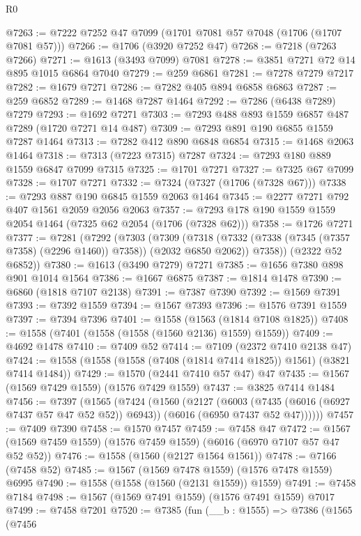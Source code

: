 \begin{lexlean}{R0}
\begin{coremodule}
@7263 := @7222 @7252 @47 @7099 (@1701 @7081 @57 @7048 (@1706 (@1707 @7081 @57)))
@7266 := @1706 (@3920 @7252 @47)
@7268 := @7218 (@7263 @7266)
@7271 := @1613 (@3493 @7099) @7081
@7278 := @3851 @7271 @72 @14 @895 @1015 @6864 @7040
@7279 := @259 @6861
@7281 := @7278 @7279 @7217
@7282 := @1679 @7271
@7286 := @7282 @405 @894 @6858 @6863
@7287 := @259 @6852
@7289 := @1468 @7287 @1464
@7292 := @7286 (@6438 @7289) @7279
@7293 := @1692 @7271
@7303 := @7293 @488 @893 @1559 @6857 @487 @7289 (@1720 @7271 @14 @487)
@7309 := @7293 @891 @190 @6855 @1559 @7287 @1464
@7313 := @7282 @412 @890 @6848 @6854
@7315 := @1468 @2063 @1464
@7318 := @7313 (@7223 @7315) @7287
@7324 := @7293 @180 @889 @1559 @6847 @7099 @7315
@7325 := @1701 @7271
@7327 := @7325 @67 @7099
@7328 := @1707 @7271
@7332 := @7324 (@7327 (@1706 (@7328 @67)))
@7338 := @7293 @887 @190 @6845 @1559 @2063 @1464
@7345 := @2277 @7271 @792 @407 @1561 @2059 @2056 @2063
@7357 := @7293 @178 @190 @1559 @1559 @2054 @1464 (@7325 @62 @2054 (@1706 (@7328 @62)))
@7358 := @1726 @7271
@7377 := @7281
    (@7292
      (@7303
        (@7309
          (@7318 (@7332 (@7338 (@7345 (@7357 @7358) (@2296 @1460)) @7358)) (@2032 @6850 @2062))
          @7358))
      (@2322 @52 @6852))
@7380 := @1613 (@3490 @7279) @7271
@7385 := @1656 @7380 @898 @901 @1014 @1564
@7386 := @1667 @6875
@7387 := @1814 @1478
@7390 := @6860 (@1818 @7107 @2138)
@7391 := @7387 @7390
@7392 := @1569 @7391
@7393 := @7392 @1559
@7394 := @1567 @7393
@7396 := @1576 @7391 @1559
@7397 := @7394 @7396
@7401 := @1558 (@1563 (@1814 @7108 @1825))
@7408 := @1558 (@7401 (@1558 (@1558 (@1560 @2136) @1559) @1559))
@7409 := @4692 @1478
@7410 := @7409 @52
@7414 := @7109 (@2372 @7410 @2138 @47)
@7424 := @1558 (@1558 (@1558 (@7408 (@1814 @7414 @1825)) @1561) (@3821 @7414 @1484))
@7429 := @1570 (@2441 @7410 @57 @47) @47
@7435 := @1567 (@1569 @7429 @1559) (@1576 @7429 @1559)
@7437 := @3825 @7414 @1484
@7456 := @7397
    (@1565
      (@7424
        (@1560
          (@2127
            (@6003 (@7435 (@6016 (@6927 @7437 @57 @47 @52 @52)) @6943))
            (@6016 (@6950 @7437 @52 @47))))))
@7457 := @7409 @7390
@7458 := @1570 @7457
@7459 := @7458 @47
@7472 := @1567 (@1569 @7459 @1559) (@1576 @7459 @1559) (@6016 (@6970 @7107 @57 @47 @52 @52))
@7476 := @1558 (@1560 (@2127 @1564 @1561))
@7478 := @7166 (@7458 @52)
@7485 := @1567 (@1569 @7478 @1559) (@1576 @7478 @1559) @6995
@7490 := @1558 (@1558 (@1560 (@2131 @1559)) @1559)
@7491 := @7458 @7184
@7498 := @1567 (@1569 @7491 @1559) (@1576 @7491 @1559) @7017
@7499 := @7458 @7201
@7520 := @7385
    (fun (__b : @1555) =>
    @7386
      (@1565
        (@7456

\end{coremodule}
\end{lexlean}
